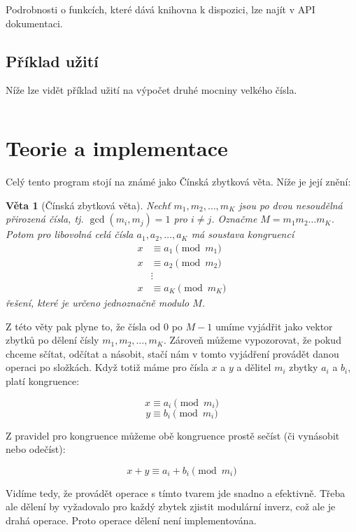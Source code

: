 \documentclass[titlepage]{article}
\newtheorem{theorem}{Věta}
\begin{document}
Podrobnosti o funkcích, které dává knihovna k dispozici, lze najít v API dokumentaci.

\subsection{Příklad užití}

Níže lze vidět příklad užití na výpočet druhé mocniny velkého čísla.

\inputminted[linenos]{c}{examples/example_square.c}

\section{Teorie a implementace}

Celý tento program stojí na známé jako Čínská zbytková věta. Níže je její
znění:

\begin{theorem}[Čínská zbytková věta]
Nechť $m_1, m_2, \dots, m_K$ jsou po dvou nesoudělná přirozená čísla, tj.
  $\gcd(m_i, m_j) = 1$ pro $i \neq j$. Označme $M = m_1 m_2 \dots m_K$. Potom
  pro libovolná celá čísla $a_1, a_2, \dots, a_K$ má soustava kongruencí
$$
\begin{aligned}
    x &\equiv a_1 \pmod{m_1} \\
    x &\equiv a_2 \pmod{m_2} \\
      &\vdots \\
    x &\equiv a_K \pmod{m_K}
\end{aligned}
$$
řešení, které je určeno jednoznačně modulo $M$.
\end{theorem}

Z této věty pak plyne to, že čísla od 0 po $M-1$ umíme vyjádřit jako vektor
zbytků po dělení čísly $m_1,m_2, \dots, m_K$. Zároveň můžeme vypozorovat, že pokud
chceme sčítat, odčítat a násobit, stačí nám v tomto vyjádření provádět danou
operaci po složkách. Když totiž máme pro čísla $x$ a $y$ a dělitel $m_i$ 
zbytky $a_i$ a $b_i$, platí kongruence:

$$ x \equiv a_i \pmod{m_i} $$ $$ y \equiv b_i \pmod{m_i} $$

Z pravidel pro kongruence můžeme obě kongruence prostě sečíst (či vynásobit
nebo odečíst):

$$ x + y \equiv a_i + b_i \pmod{m_i} $$

Vidíme tedy, že provádět operace s tímto tvarem jde snadno a efektivně. Třeba
ale dělení by vyžadovalo pro každý zbytek zjistit modulární inverz, což ale je
drahá operace. Proto operace dělení není implementována.
\end{document}
